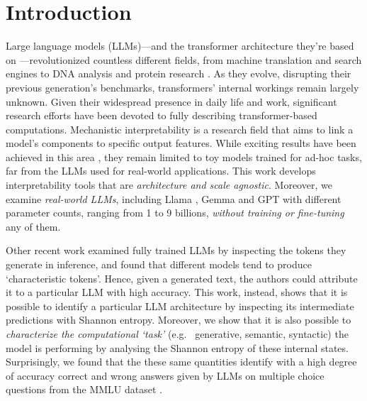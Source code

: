 \section{Introduction} \label{sec:intro}

% 
% 
Large language models (LLMs)—and the transformer architecture they're based on \citep{vaswani2023attentionneed}—revolutionized countless different fields, from machine translation and search engines to DNA analysis and protein research \citep{devlin2018bert, khattab2020colbert, ji2021dnabert, chandra2023transformer}. 
% 
% 
% 
% 
As they evolve, disrupting their previous generation's benchmarks, transformers' internal workings remain largely unknown. Given their widespread presence in daily life and work, significant research efforts have been devoted to fully describing transformer-based computations. 
% 
% 
% 
% 
Mechanistic interpretability \cite{bereska2024mechanisticinterpretabilityaisafety} is a research field that aims to link a model’s components to specific output features. 
% 
% 
% 
% 
While exciting results have been achieved in this area \citep{nanda2023progressmeasuresgrokkingmechanistic, elhage2022superposition}, they remain limited to toy models trained for ad-hoc tasks, far from the LLMs used for real-world applications.  \newline
% 
% 
% 
% 
This work develops interpretability tools that are \textit{architecture and scale agnostic}. Moreover, we examine \textit{real-world LLMs}, including Llama \citep{touvron2023llamaopenefficientfoundation}, Gemma \citep{gemmateam2024gemmaopenmodelsbased} and GPT \citep{radford2018improving} with different parameter counts, ranging from 1 to 9 billions, \textit{without training or fine-tuning} any of them. 

Other recent work \citep{sun2025idiosyncrasieslargelanguagemodels} examined fully trained LLMs by inspecting the tokens they generate in inference, and found that different models tend to produce `characteristic tokens'. Hence, given a generated text, the authors could attribute it to a particular LLM with high accuracy.\newline
This work, instead, shows that it is possible to identify a particular LLM architecture by inspecting its intermediate predictions with Shannon entropy. Moreover, we show that it is also possible to \textit{characterize the computational `task'} (e.g.~ generative, semantic, syntactic) the model is performing by analysing the Shannon entropy of these internal states. Surprisingly, we found that the these same quantities identify with a high degree of accuracy correct and wrong answers given by LLMs on multiple choice questions from the MMLU dataset \cite{hendrycks2021measuringmassivemultitasklanguage}.

